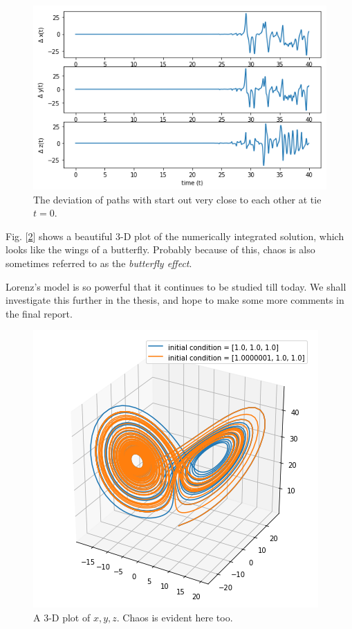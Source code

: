 \begin{figure}[h!]
	\centering
	\includegraphics[scale=0.8]{Figures/delta_trajectory.png}
	\caption[An Electron]{The deviation of paths with start out very close to each other at tie $t=0$.}
	\label{fig:delta_trajectory}
\end{figure}
Fig. [\ref{fig:3d_trajectory}] shows a beautiful 3-D plot of the numerically integrated solution, which looks like the wings of a butterfly. Probably because of this, chaos is also sometimes referred to as the \textit{butterfly effect}.

Lorenz's model is so powerful that it continues to be studied till today. We shall investigate this further in the thesis, and hope to make some more comments in the final report.
\begin{figure}[h!]
	\centering
	\includegraphics[scale=0.7]{Figures/3d_trajectory.png}
	\caption[An Electron]{A 3-D plot of $x,y,z$. Chaos is evident here too.}
	\label{fig:3d_trajectory}
\end{figure}
